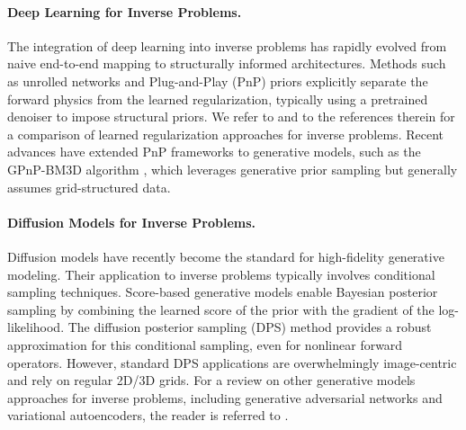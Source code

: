 \documentclass[a4paper,11pt]{article}
\theoremstyle{definition}
\theoremstyle{plain}
\theoremstyle{remark}
\begin{document}
\paragraph{Deep Learning for Inverse Problems.}
The integration of deep learning into inverse problems has rapidly evolved from naive end-to-end mapping to structurally informed architectures. Methods such as unrolled networks \cite{monga2021algorithm} and Plug-and-Play (PnP) priors \cite{venkatakrishnan2013plug} explicitly separate the forward physics from the learned regularization, typically using a pretrained denoiser to impose structural priors. We refer to \cite{hertrich2025learning} and to the references therein for a comparison of learned regularization approaches for inverse problems. Recent advances have extended PnP frameworks to generative models, such as the GPnP-BM3D algorithm \cite{bouman2023generative}, which leverages generative prior sampling but generally assumes grid-structured data.

\paragraph{Diffusion Models for Inverse Problems.}
Diffusion models \cite{ho2020denoising} have recently become the standard for high-fidelity generative modeling. Their application to inverse problems typically involves conditional sampling techniques. Score-based generative models \cite{song2020score} enable Bayesian posterior sampling by combining the learned score of the prior with the gradient of the log-likelihood. The diffusion posterior sampling (DPS) method \cite{DPS24} provides a robust approximation for this conditional sampling, even for nonlinear forward operators. However, standard DPS applications are overwhelmingly image-centric and rely on regular 2D/3D grids. For a review on other generative models approaches for inverse problems, including generative adversarial networks and variational autoencoders, the reader is referred to \cite{duff-etal-2024}.
\end{document}
